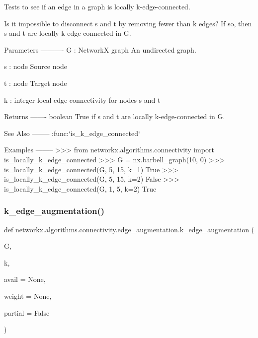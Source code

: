\begin{DoxyVerb}Tests to see if an edge in a graph is locally k-edge-connected.

Is it impossible to disconnect s and t by removing fewer than k edges?
If so, then s and t are locally k-edge-connected in G.

Parameters
----------
G : NetworkX graph
   An undirected graph.

s : node
    Source node

t : node
    Target node

k : integer
    local edge connectivity for nodes s and t

Returns
-------
boolean
    True if s and t are locally k-edge-connected in G.

See Also
--------
:func:`is_k_edge_connected`

Examples
--------
>>> from networkx.algorithms.connectivity import is_locally_k_edge_connected
>>> G = nx.barbell_graph(10, 0)
>>> is_locally_k_edge_connected(G, 5, 15, k=1)
True
>>> is_locally_k_edge_connected(G, 5, 15, k=2)
False
>>> is_locally_k_edge_connected(G, 1, 5, k=2)
True
\end{DoxyVerb}
 \mbox{\label{namespacenetworkx_1_1algorithms_1_1connectivity_1_1edge__augmentation_aa5ba4f94f43fea04c2dd588220e0ecf6}} 
\subsubsection{\texorpdfstring{k\+\_\+edge\+\_\+augmentation()}{k\_edge\_augmentation()}}
{\footnotesize\ttfamily def networkx.\+algorithms.\+connectivity.\+edge\+\_\+augmentation.\+k\+\_\+edge\+\_\+augmentation (\begin{DoxyParamCaption}\item[{}]{G,  }\item[{}]{k,  }\item[{}]{avail = {\ttfamily None},  }\item[{}]{weight = {\ttfamily None},  }\item[{}]{partial = {\ttfamily False} }\end{DoxyParamCaption})}

